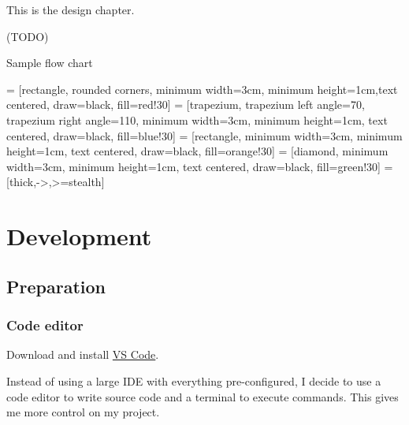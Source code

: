 \documentclass{report}
\begin{document}
This is the design chapter.

(TODO)

Sample flow chart

 = [rectangle, rounded corners, minimum width=3cm, minimum height=1cm,text centered, draw=black, fill=red!30]
 = [trapezium, trapezium left angle=70, trapezium right angle=110, minimum width=3cm, minimum height=1cm, text centered, draw=black, fill=blue!30]
 = [rectangle, minimum width=3cm, minimum height=1cm, text centered, draw=black, fill=orange!30]
 = [diamond, minimum width=3cm, minimum height=1cm, text centered, draw=black, fill=green!30]
 = [thick,->,>=stealth]


\chapter{Development}

\section{Preparation}

\subsection{Code editor}

Download and install \href{https://code.visualstudio.com/}{VS Code}.

Instead of using a large IDE with everything pre-configured, I decide to use a code editor to write source code and a terminal to execute commands. This gives me more control on my project.
\end{document}
